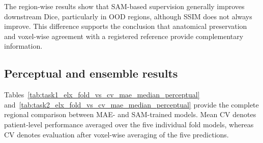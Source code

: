 \documentclass[lettersize,journal]{IEEEtran}
\begin{document}
The region-wise results show that SAM-based supervision generally improves downstream Dice, particularly in OOD regions, although SSIM
does not always improve. This difference supports the conclusion that anatomical preservation and voxel-wise agreement with a registered reference provide complementary information.

\subsection{Perceptual and ensemble results}
\label{app:perceptual_results}

Tables~\ref{tab:task1_elx_fold_vs_cv_mae_median_perceptual} and~\ref{tab:task2_elx_fold_vs_cv_mae_median_perceptual} provide the complete regional comparison between MAE- and SAM-trained models. Mean CV denotes patient-level performance averaged over the five individual fold models, whereas CV denotes evaluation after voxel-wise averaging of the five predictions.
\end{document}
